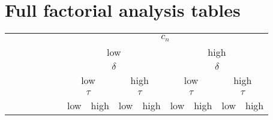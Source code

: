 \documentclass[a4paper,10pt]{article}
\begin{document}
\section{Full factorial analysis tables}
    \begin{table}[htp]
        \begin{center}
        \begin{small}
        \begin{tabular}{cccccc|cccccccc}
           &&&&&& \multicolumn{8}{c}{$c_n$} \\
        &&&&&& \multicolumn{4}{c}{low}&\multicolumn{4}{c}{high} \\
           \hline
        &&&&&& \multicolumn{4}{c}{$\delta$}&\multicolumn{4}{c}{$\delta$} \\
        &&&&&& \multicolumn{2}{c}{low}&\multicolumn{2}{c}{high}&\multicolumn{2}{c}{low}&\multicolumn{2}{c}{high} \\
           \hline
        &&&&&& \multicolumn{2}{c}{$\tau$}&\multicolumn{2}{c}{$\tau$}&\multicolumn{2}{c}{$\tau$}&\multicolumn{2}{c}{$\tau$}\\
    &&&&&&low&high&low&high&low&high&low&high\\
    

\end{tabular}
\end{small}
\end{center}
\end{table}
\end{document}
